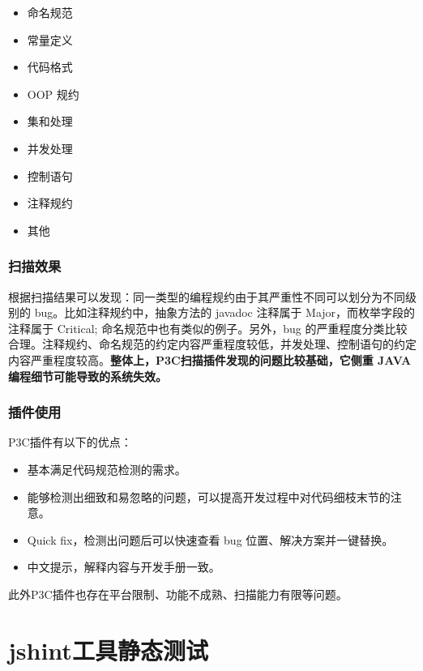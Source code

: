 \documentclass[hyperref, a4paper]{ctexart}
\providecommand{\tightlist}{%
  \setlength{\itemsep}{0pt}\setlength{\parskip}{0pt}}
\begin{document}
\begin{itemize}
\tightlist
\item
  命名规范
\item
  常量定义
\item
  代码格式
\item
  OOP 规约
\item
  集和处理
\item
  并发处理
\item
  控制语句
\item
  注释规约
\item
  其他
\end{itemize}

\hypertarget{ux626bux63cfux6548ux679c}{%
\subsubsection{扫描效果}\label{ux626bux63cfux6548ux679c}}

根据扫描结果可以发现：同一类型的编程规约由于其严重性不同可以划分为不同级别的
bug。比如注释规约中，抽象方法的 javadoc 注释属于
Major，而枚举字段的注释属于 Critical;
命名规范中也有类似的例子。另外，bug
的严重程度分类比较合理。注释规约、命名规范的约定内容严重程度较低，并发处理、控制语句的约定内容严重程度较高。\textbf{整体上，P3C扫描插件发现的问题比较基础，它侧重
JAVA 编程细节可能导致的系统失效。}

\hypertarget{ux63d2ux4ef6ux4f7fux7528}{%
\subsubsection{插件使用}\label{ux63d2ux4ef6ux4f7fux7528}}

P3C插件有以下的优点：

\begin{itemize}
\tightlist
\item
  基本满足代码规范检测的需求。
\item
  能够检测出细致和易忽略的问题，可以提高开发过程中对代码细枝末节的注意。
\item
  Quick fix，检测出问题后可以快速查看 bug 位置、解决方案并一键替换。
\item
  中文提示，解释内容与开发手册一致。
\end{itemize}

此外P3C插件也存在平台限制、功能不成熟、扫描能力有限等问题。

\hypertarget{jshintux5de5ux5177ux9759ux6001ux6d4bux8bd5}{%
\section{jshint工具静态测试}\label{jshintux5de5ux5177ux9759ux6001ux6d4bux8bd5}}
\end{document}
